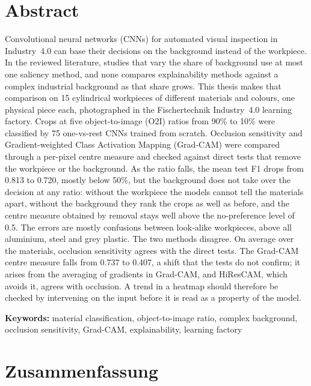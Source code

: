 \chapter*{Abstract}

Convolutional neural networks (CNNs) for automated visual inspection in Industry~4.0 can
base their decisions on the background instead of the workpiece. In the reviewed
literature, studies that vary the share of background use at most one saliency method,
and none compares explainability methods against a complex industrial background as that
share grows. This thesis makes that comparison on 15 cylindrical workpieces of different
materials and colours, one physical piece each, photographed in the Fischertechnik
Industry~4.0 learning factory. Crops at five object-to-image (O2I) ratios from 90\% to
10\% were classified by 75 one-vs-rest CNNs trained from scratch. Occlusion sensitivity
and Gradient-weighted Class Activation Mapping (Grad-CAM) were compared through a
per-pixel centre measure and checked against direct tests that remove the workpiece or
the background. As the ratio falls, the mean test F1 drops from 0.813 to 0.720, mostly
below 50\%, but the background does not take over the decision at any ratio: without
the workpiece the models cannot tell the materials apart, without the background they
rank the crops as well as before, and the centre measure obtained by removal stays well
above the no-preference level of 0.5. The errors are mostly confusions between
look-alike workpieces, above all aluminium, steel and grey plastic. The two methods
disagree. On average over the materials, occlusion sensitivity agrees with the direct
tests. The Grad-CAM centre
measure falls from 0.737 to 0.407, a shift that the tests do not confirm; it arises from
the averaging of gradients in Grad-CAM, and HiResCAM, which avoids it, agrees with
occlusion. A trend in a heatmap should therefore be checked by intervening on the input
before it is read as a property of the model.

\vspace{1cm}
\noindent\textbf{Keywords:} material classification, object-to-image ratio, complex background,
occlusion sensitivity, Grad-CAM, explainability, learning factory

\chapter*{Zusammenfassung}

